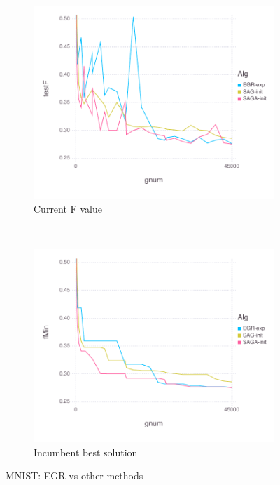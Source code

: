 \documentclass[11pt]{article}
\begin{document}
   \begin{figure}[H]
       \centering
       \begin{subfigure}[b]{0.45\textwidth}
           \includegraphics[width=\textwidth]{Figures/MNISTBLtrueFfFinal-g.pdf}
           \caption{Current F value}
       \end{subfigure}
       ~ %
         \begin{subfigure}[b]{0.45\textwidth}
             \includegraphics[width=\textwidth]{Figures/MNISTBLtrueFminfFinal-g.pdf}
             \caption{Incumbent best solution}
         \end{subfigure}
       \caption{MNIST: EGR vs other methods}\label{fig:MNISTom}
   \end{figure}
   
\end{document}
